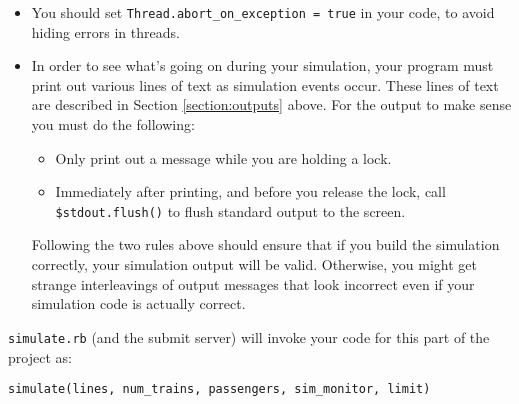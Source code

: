 \documentclass[11pt]{article}
\begin{document}
\begin{itemize}
        \item You should set \texttt{Thread.abort\_on\_exception = true} in
              your code, to avoid hiding errors in threads.

        \item In order to see what's going on during your simulation, your
              program must print out various lines of text as simulation
              events occur.  These lines of text are described in Section
              \ref{section:outputs} above.  For the output to make sense
              you must do the following:

              \vspace{-2.5mm}

              \begin{itemize}

                \addtolength{\itemsep}{0mm}

                \item Only print out a message while you are holding a lock.

                \item Immediately after printing, and before you release the
                      lock, call \texttt{\$stdout.flush()} to flush standard
                      output to the screen.

              \end{itemize}

              \vspace{-2.5mm}

              Following the two rules above should ensure that if you build
              the simulation correctly, your simulation output will be
              valid. Otherwise, you might get strange interleavings of
              output messages that look incorrect even if your simulation
              code is actually correct.

      \end{itemize}

      \vspace{-1.5mm}

      \texttt{simulate.rb} (and the submit server) will invoke your code for
      this part of the project as:

      \vspace{-2.5mm}

      \begin{center}

        \texttt{simulate(lines, num\_trains, passengers, sim\_monitor, limit)}

      \end{center}
\end{document}
